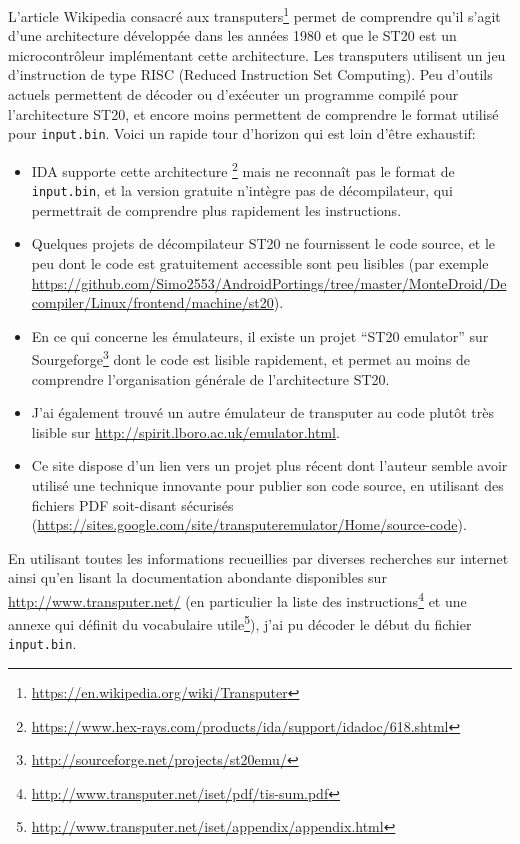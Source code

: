 \documentclass[a4paper,10pt]{article}
\begin{document}
L'article Wikipedia consacré aux transputers\footnote{\url{https://en.wikipedia.org/wiki/Transputer}} permet de comprendre qu'il s'agit d'une architecture développée dans les années 1980 et que le ST20 est un microcontrôleur implémentant cette architecture.
Les transputers utilisent un jeu d'instruction de type RISC (Reduced Instruction Set Computing).
Peu d'outils actuels permettent de décoder ou d'exécuter un programme compilé pour l'architecture ST20, et encore moins permettent de comprendre le format utilisé pour \texttt{input.bin}.
Voici un rapide tour d'horizon qui est loin d'être exhaustif:
\begin{itemize}
  \item IDA supporte cette architecture \footnote{\url{https://www.hex-rays.com/products/ida/support/idadoc/618.shtml}} mais ne reconnaît pas le format de \texttt{input.bin}, et la version gratuite n'intègre pas de décompilateur, qui permettrait de comprendre plus rapidement les instructions.
  \item Quelques projets de décompilateur ST20 ne fournissent le code source, et le peu dont le code est gratuitement accessible sont peu lisibles (par exemple \url{https://github.com/Simo2553/AndroidPortings/tree/master/MonteDroid/Decompiler/Linux/frontend/machine/st20}).
  \item En ce qui concerne les émulateurs, il existe un projet ``ST20 emulator'' sur Sourgeforge\footnote{\url{http://sourceforge.net/projects/st20emu/}} dont le code est lisible rapidement, et permet au moins de comprendre l'organisation générale de l'architecture ST20.
  \item J'ai également trouvé un autre émulateur de transputer au code plutôt très lisible sur \url{http://spirit.lboro.ac.uk/emulator.html}.
  \item Ce site dispose d'un lien vers un projet plus récent dont l'auteur semble avoir utilisé une technique innovante pour publier son code source, en utilisant des fichiers PDF soit-disant sécurisés (\url{https://sites.google.com/site/transputeremulator/Home/source-code}).
\end{itemize}

En utilisant toutes les informations recueillies par diverses recherches sur internet ainsi qu'en lisant la documentation abondante disponibles sur \url{http://www.transputer.net/} (en particulier la liste des instructions\footnote{\url{http://www.transputer.net/iset/pdf/tis-sum.pdf}} et une annexe qui définit du vocabulaire utile\footnote{\url{http://www.transputer.net/iset/appendix/appendix.html}}), j'ai pu décoder le début du fichier \texttt{input.bin}.
\end{document}

